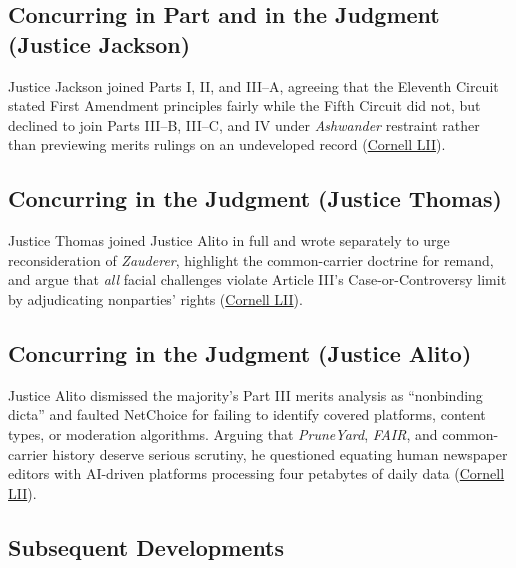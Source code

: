 \documentclass[12pt]{article}
\begin{document}
\subsection{Concurring in Part and in the Judgment (Justice Jackson)}

Justice Jackson joined Parts I, II, and III--A, agreeing that the Eleventh Circuit stated First Amendment principles fairly while the Fifth Circuit did not, but declined to join Parts III--B, III--C, and IV under \textit{Ashwander} restraint rather than previewing merits rulings on an undeveloped record (\href{https://www.law.cornell.edu/supremecourt/text/22-277}{Cornell LII}).

\subsection{Concurring in the Judgment (Justice Thomas)}

Justice Thomas joined Justice Alito in full and wrote separately to urge reconsideration of \textit{Zauderer}, highlight the common-carrier doctrine for remand, and argue that \emph{all} facial challenges violate Article III's Case-or-Controversy limit by adjudicating nonparties' rights (\href{https://www.law.cornell.edu/supremecourt/text/22-277}{Cornell LII}).

\subsection{Concurring in the Judgment (Justice Alito)}

Justice Alito dismissed the majority's Part III merits analysis as ``nonbinding dicta'' and faulted NetChoice for failing to identify covered platforms, content types, or moderation algorithms. Arguing that \textit{PruneYard}, \textit{FAIR}, and common-carrier history deserve serious scrutiny, he questioned equating human newspaper editors with AI-driven platforms processing four petabytes of daily data (\href{https://www.law.cornell.edu/supremecourt/text/22-277}{Cornell LII}).

\subsection{Subsequent Developments}
\end{document}
